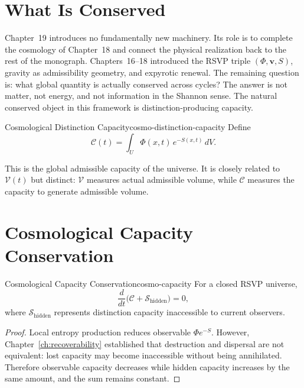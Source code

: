 \documentclass[12pt,twoside,openright]{book}
\begin{document}
\section{What Is Conserved}
\label{sec:ch19-conserved}

Chapter~19 introduces no fundamentally new machinery. Its
role is to complete the cosmology of Chapter~18 and connect
the physical realization back to the rest of the monograph.
Chapters~16--18 introduced the RSVP triple
$(\Phi,\mathbf{v},S)$, gravity as admissibility geometry,
and expyrotic renewal. The remaining question is: what
global quantity is actually conserved across cycles? The
answer is not matter, not energy, and not information in
the Shannon sense. The natural conserved object in this
framework is distinction-producing capacity.

\begin{definition}{Cosmological Distinction Capacity}{cosmo-distinction-capacity}
  Define
  \[
    \mathcal{C}(t) = \int_U \Phi(x,t)\, e^{-S(x,t)} \, dV.
  \]
\end{definition}

This is the global admissible capacity of the universe. It
is closely related to $\mathcal{V}(t)$ but distinct: $\mathcal{V}$
measures actual admissible volume, while $\mathcal{C}$
measures the capacity to generate admissible volume.

\section{Cosmological Capacity Conservation}
\label{sec:ch19-conservation}

\begin{theorem}{Cosmological Capacity Conservation}{cosmo-capacity}
  For a closed RSVP universe,
  \[
    \frac{d}{dt}\bigl(\mathcal{C} + \mathcal{S}_{\mathrm{hidden}}\bigr)
    = 0,
  \]
  where $\mathcal{S}_{\mathrm{hidden}}$ represents
  distinction capacity inaccessible to current observers.
\end{theorem}

\begin{proof}
  Local entropy production reduces observable $\Phi e^{-S}$.
  However, Chapter~\ref{ch:recoverability} established that
  destruction and dispersal are not equivalent: lost
  capacity may become inaccessible without being
  annihilated. Therefore observable capacity decreases
  while hidden capacity increases by the same amount, and
  the sum remains constant.
\end{proof}
\end{document}
